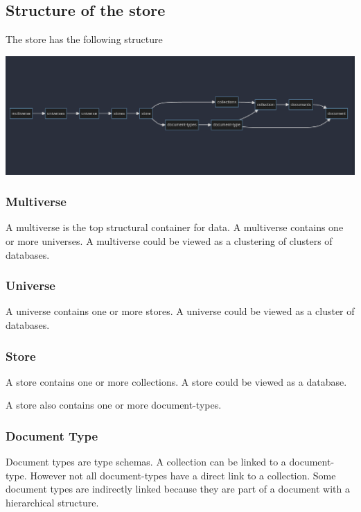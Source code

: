 \documentclass[11pt]{article}
\begin{document}
\subsection{Structure of the store}
\label{sec:orgfbb86b6}

The store has the following structure 

\begin{center}
\includegraphics[width=.9\linewidth]{multiverse.png}
\end{center}

\subsubsection{Multiverse}
\label{sec:org8a3cf84}

A multiverse is the top structural container for data. A multiverse
contains one or more universes. A multiverse could be viewed as a
clustering of clusters of databases.

\subsubsection{Universe}
\label{sec:org266c5eb}

A universe contains one or more stores. A universe could be viewed as
a cluster of databases.

\subsubsection{Store}
\label{sec:orgf758660}

A store contains one or more collections. A store could be viewed as a database.

A store also contains one or more document-types.

\subsubsection{Document Type}
\label{sec:org4617506}

Document types are type schemas. A collection can be linked to a document-type. However
not all document-types have a direct link to a collection. Some
document types are indirectly linked because they are part of a
document with a hierarchical structure.
\end{document}
